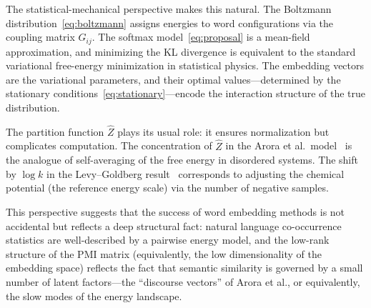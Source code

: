 \documentclass[11pt]{article}
\begin{document}
The statistical-mechanical perspective makes this natural. The Boltzmann distribution~\eqref{eq:boltzmann} assigns energies to word configurations via the coupling matrix $G_{ij}$. The softmax model~\eqref{eq:proposal} is a mean-field approximation, and minimizing the KL divergence is equivalent to the standard variational free-energy minimization in statistical physics. The embedding vectors are the variational parameters, and their optimal values---determined by the stationary conditions~\eqref{eq:stationary}---encode the interaction structure of the true distribution.

The partition function $\hat{Z}$ plays its usual role: it ensures normalization but complicates computation. The concentration of $\hat{Z}$ in the Arora et al.\ model~\cite{arora2016} is the analogue of self-averaging of the free energy in disordered systems. The shift by $\log k$ in the Levy--Goldberg result~\cite{levy2014} corresponds to adjusting the chemical potential (the reference energy scale) via the number of negative samples.

This perspective suggests that the success of word embedding methods is not accidental but reflects a deep structural fact: natural language co-occurrence statistics are well-described by a pairwise energy model, and the low-rank structure of the PMI matrix (equivalently, the low dimensionality of the embedding space) reflects the fact that semantic similarity is governed by a small number of latent factors---the ``discourse vectors'' of Arora et al., or equivalently, the slow modes of the energy landscape.
\end{document}
